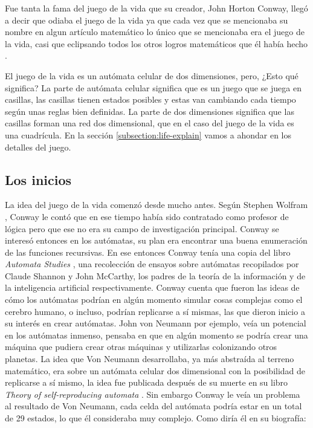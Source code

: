 Fue tanta la fama del juego de la vida que su creador, John Horton Conway, lleg\'o a decir que odiaba el juego de la vida ya que cada vez que se mencionaba su nombre en algun art\'iculo matem\'atico lo \'unico que se mencionaba era el juego de la vida, casi que eclipsando todos los otros logros matem\'aticos que \'el hab\'ia hecho \cite{YTNumberphileConway}.

El juego de la vida es un aut\'omata celular de dos dimensiones, pero, ¿Esto qu\'e significa? La parte de aut\'omata celular significa que es un juego que se juega en casillas, las casillas tienen estados posibles y estas van cambiando cada tiempo seg\'un unas reglas bien definidas. La parte de dos dimensiones significa que las casillas forman una red dos dimensional, que en el caso del juego de la vida es una cuadr\'icula. En la secci\'on \ref{subsection:life-explain} vamos a ahondar en los detalles del juego.
\subsection{Los inicios}

La idea del juego de la vida comenz\'o desde mucho antes. Seg\'un Stephen Wolfram \cite{MathematicalArtist2022}, Conway le cont\'o que en ese tiempo hab\'ia sido contratado como profesor de l\'ogica pero que ese no era su campo de investigaci\'on principal. Conway se interes\'o entonces en los aut\'omatas, su plan era encontrar una buena enumeraci\'on de las funciones recursivas. En ese entonces Conway ten\'ia una copia del libro \textit{Automata Studies} \cite{Shannon1956}, una recolecci\'on de ensayos sobre aut\'omatas recopilados por Claude Shannon y John McCarthy, los padres de la teor\'ia de la informaci\'on y de la inteligencia artificial respectivamente. Conway cuenta que fueron las ideas de c\'omo los aut\'omatas podr\'ian en alg\'un momento simular cosas complejas como el cerebro humano, o incluso, podr\'ian replicarse a s\'i mismas, las que dieron inicio a su inter\'es en crear aut\'omatas. John von Neumann por ejemplo, ve\'ia un potencial en los aut\'omatas inmenso, pensaba en que en alg\'un momento se podr\'ia crear una m\'aquina que pudiera crear otras m\'aquinas y utilizarlas colonizando otros planetas. La idea que Von Neumann desarrollaba, ya m\'as abstra\'ida al terreno matem\'atico, era sobre un aut\'omata celular dos dimensional con la posibilidad de replicarse a s\'i mismo, la idea fue publicada despu\'es de su muerte en su libro \textit{Theory of self-reproducing automata} \cite{Von_Neumann1967-ma}. Sin embargo Conway le ve\'ia un problema al resultado de Von Neumann, cada celda del aut\'omata podr\'ia estar en un total de 29 estados, lo que \'el consideraba muy complejo. Como dir\'ia \'el en su biograf\'ia:

